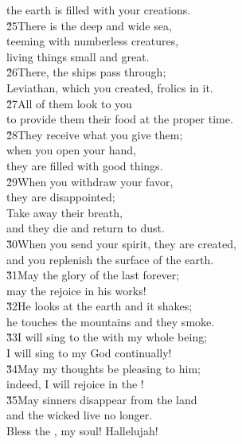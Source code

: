 \begin{poetry}
\poemlll       the earth is filled with your creations. \\
\poeml \v{25}There is the deep and wide sea, \\
\poemll    teeming with numberless creatures, \\
\poemlll       living things small and great. \\
\poeml \v{26}There, the ships pass through; \\
\poemll    Leviathan, which you created, frolics in it. \\
\poeml \v{27}All of them look to you \\
\poemll    to provide them their food at the proper time. \\
\poeml \v{28}They receive what you give them; \\
\poemll    when you open your hand, \\
\poemlll       they are filled with good things. \\
\poeml \v{29}When you withdraw your favor, \\
\poemll    they are disappointed; \\
\poeml Take away their breath, \\
\poemll    and they die and return to dust. \\
\poeml \v{30}When you send your spirit, they are created, \\
\poemll    and you replenish the surface of the earth. \\
\poeml \v{31}May the glory of the  last forever; \\
\poemll    may the  rejoice in his works! \\
\poeml \v{32}He looks at the earth and it shakes; \\
\poemll    he touches the mountains and they smoke. \\
\poeml \v{33}I will sing to the  with my whole being; \\
\poemll    I will sing to my God continually! \\
\poeml \v{34}May my thoughts be pleasing to him; \\
\poemll    indeed, I will rejoice in the ! \\
\poeml \v{35}May sinners disappear from the land \\
\poemll    and the wicked live no longer. \\
\poeml Bless the , my soul! Hallelujah!
\end{poetry}

